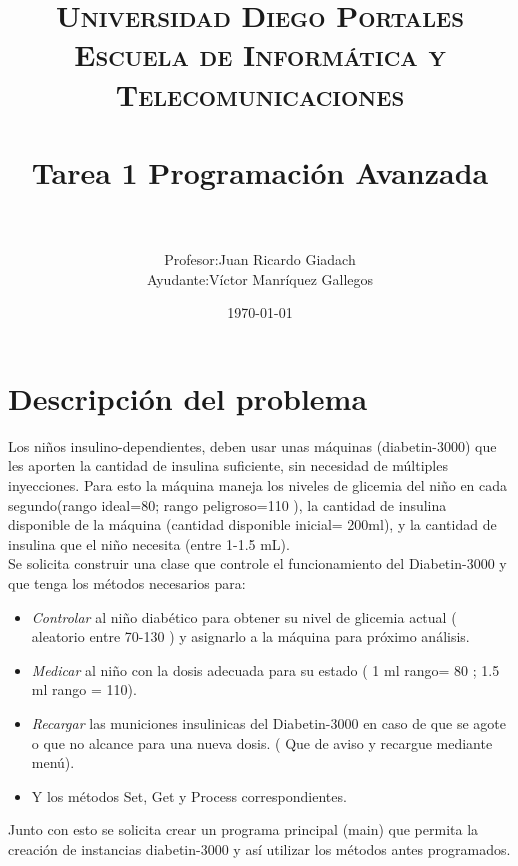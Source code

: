 \documentclass[paper=a4, fontsize=11pt]{scrartcl} %
\author{Profesor:Juan Ricardo Giadach\\Ayudante:Víctor Manríquez Gallegos}
\title{	
\normalfont \normalsize 
\textsc{Universidad Diego Portales\\Escuela de Informática y Telecomunicaciones} \\ [25pt] %
\horrule{0.5pt} \\[0.4cm] %
\huge Tarea 1 Programación Avanzada \\ %
\horrule{2pt} \\[0.5cm] %
}
\date{\normalsize\today} %
\numberwithin{equation}{section} %
\numberwithin{figure}{section} %
\numberwithin{table}{section} %
\begin{document}
\maketitle %


\section{Descripción del problema}
Los niños insulino-dependientes, deben usar unas máquinas (diabetin-3000) que les aporten la cantidad de insulina suficiente, sin necesidad de múltiples inyecciones. Para esto la máquina maneja los niveles de glicemia del niño en cada segundo(rango ideal=80; rango peligroso=110 ), la cantidad de insulina disponible de la máquina (cantidad disponible inicial= 200ml), y la cantidad de insulina que el niño necesita (entre 1-1.5 mL).\\
Se solicita construir una clase que controle el funcionamiento del Diabetin-3000 y que tenga los métodos necesarios para:\\
\begin{itemize}

\item \textit{Controlar} al niño diabético para obtener su nivel de glicemia actual ( aleatorio entre 70-130 ) y asignarlo a la máquina para próximo análisis.\\

\item \textit{Medicar} al niño con la dosis adecuada para su estado ( 1 ml rango= 80 ; 1.5 ml rango = 110).\\

\item \textit{Recargar} las municiones insulinicas del Diabetin-3000 en caso de que se agote o que no alcance para una nueva dosis. ( Que de aviso y recargue mediante menú).\\
\item Y los métodos Set, Get y Process correspondientes.\\
 \end{itemize}
Junto con esto se solicita crear un programa principal (main) que permita la creación de instancias diabetin-3000 y así utilizar los métodos antes programados.
\end{document}
